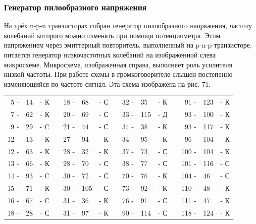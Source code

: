 \documentclass[12pt]{article}
\begin{document}
\hrulefill

\newpage

\subsubsection{Генератор пилообразного напряжения}

На трёх n-p-n транзисторах собран генератор пилообразного напряжения, частоту колебаний которого можно изменять при помощи потенциометра. Этим напряжением через эмиттерный повторитель, выполненный на p-n-p-транзисторе, питается генератор низкочастотных колебаний на изображенной слева микросхеме. Микросхема, изображенная справа, выполняет роль усилителя низкой частоты. При работе схемы в громкоговорителе слышен постепенно изменяющийся по частоте сигнал. Эта схема изображена на рис. 71.

\hrulefill

\begin{tabular}{r l r p{0.5cm} r l r p{0.5cm} r l r p{0.5cm} r l r}
 5 - &  14 & - К &   & 18 - &  68 & - С &   &  32 - &  35 & - К &   &  91 - & 123  & - К\\
 7 - &  62 & - К &   & 20 - &  69 & - С &   &  33 - & 115 & - Д &   &  93 - & 100  & - К\\
 9 - &  29 & - C &   & 21 - &  44 & - С &   &  34 - &  38 & - К &   &  93 - & 117  & - К\\
12 - &  13 & - К &   & 27 - &  94 & - К &   &  34 - &  95 & - К &   &  96 - & 104  & - К\\
12 - &  63 & - К &   & 28 - &  32 & - К &   &  37 - &  73 & - С &   & 100 - & 104  & - К\\
13 - &  66 & - К &   & 28 - &  70 & - С &   &  38 - &  77 & - С &   & 101 - & 116  & - С\\
14 - &  93 & - C &   & 30 - &  72 & - С &   &  70 - &  76 & - К &   & 104 - &  46  & - С\\
15 - &  71 & - К &   & 30 - & 105 & - С &   &  73 - &  92 & - К &   & 110 - &  48  & - К\\
16 - &  67 & - C &   & 31 - &  36 & - К &   &  76 - &  91 & - С &   & 111 - &  47  & - К\\
18 - &  28 & - С &   & 31 - &  97 & - К &   &  90 - & 114 & - С &   & 118 - & 124  & - К\\
\end{tabular}

\hrulefill

\newpage
\end{document}
